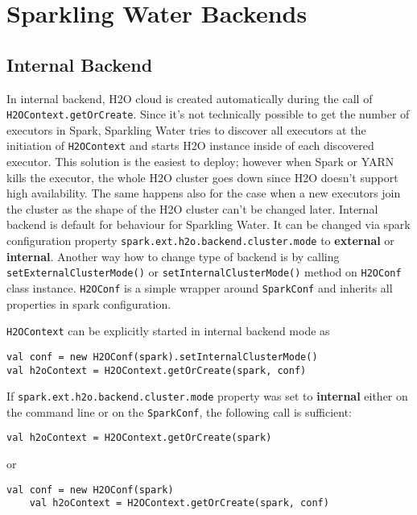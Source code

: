 \section{Sparkling Water Backends}

\subsection{Internal Backend}

In internal backend, H2O cloud is created automatically during the call of \texttt{H2OContext.getOrCreate}. Since it's not technically possible to get the number of executors in Spark, Sparkling Water tries to discover all executors at the initiation of \texttt{H2OContext} and starts H2O instance inside of each discovered executor. This solution is the easiest to deploy; however when Spark or YARN kills the executor, the whole H2O cluster goes down since H2O doesn't support high availability. The
same happens also for the case when a new executors join the cluster as the shape of the H2O cluster can't be changed later.
Internal backend is default for behaviour for Sparkling Water. It can be changed via spark configuration property
\texttt{spark.ext.h2o.backend.cluster.mode} to \textbf{external} or \textbf{internal}. Another way how to change type of backend is by calling \texttt{setExternalClusterMode()} or \texttt{setInternalClusterMode()} method on \texttt{H2OConf} class instance.
\texttt{H2OConf} is a simple wrapper around \texttt{SparkConf} and inherits all properties in spark configuration.

\texttt{H2OContext} can be explicitly started in internal backend mode as

\begin{lstlisting}[style=Scala]
val conf = new H2OConf(spark).setInternalClusterMode()
val h2oContext = H2OContext.getOrCreate(spark, conf)
\end{lstlisting}

If \texttt{spark.ext.h2o.backend.cluster.mode} property was set to \textbf{internal} either on the command line or on the \texttt{SparkConf}, the following call is sufficient:

\begin{lstlisting}[style=Scala]
val h2oContext = H2OContext.getOrCreate(spark)
\end{lstlisting}

or

\begin{lstlisting}[style=Scala]
    val conf = new H2OConf(spark)
    val h2oContext = H2OContext.getOrCreate(spark, conf)
\end{lstlisting}

